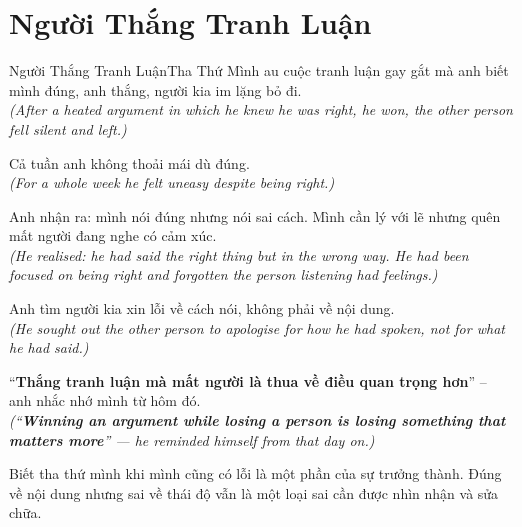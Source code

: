 \section{Người Thắng Tranh Luận}
\begin{truyen}{Người Thắng Tranh Luận}{Tha Thứ Mình}
au cuộc tranh luận gay gắt mà anh biết mình đúng, anh thắng, người kia im lặng bỏ đi.\\
\textit{(After a heated argument in which he knew he was right, he won, the other person fell silent and left.)}

Cả tuần anh không thoải mái dù đúng.\\
\textit{(For a whole week he felt uneasy despite being right.)}

Anh nhận ra: mình nói đúng nhưng nói sai cách. Mình cần lý với lẽ nhưng quên mất người đang nghe có cảm xúc.\\
\textit{(He realised: he had said the right thing but in the wrong way. He had been focused on being right and forgotten the person listening had feelings.)}

Anh tìm người kia xin lỗi về cách nói, không phải về nội dung.\\
\textit{(He sought out the other person to apologise for how he had spoken, not for what he had said.)}

``\textbf{Thắng tranh luận mà mất người là thua về điều quan trọng hơn}'' -- anh nhắc nhớ mình từ hôm đó.\\
\textit{(``\textbf{Winning an argument while losing a person is losing something that matters more}'' --- he reminded himself from that day on.)}
\end{truyen}
\begin{baihoc}
  Biết tha thứ mình khi mình cũng có lỗi là một phần của sự trưởng thành. Đúng về nội dung nhưng sai về thái độ vẫn là một loại sai cần được nhìn nhận và sửa chữa.
\end{baihoc}

